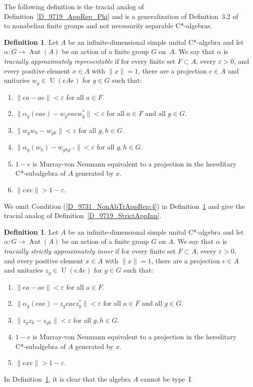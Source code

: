 \documentclass[10pt]{amsart}
\numberwithin{equation}{section}
\theoremstyle{definition}
\newtheorem{dfn}[thm]{Definition}
\newcommand{\af}{\alpha}
\newcommand{\ep}{\varepsilon}
\newcommand{\Aut}{{\operatorname{Aut}}}
\newcommand{\U}{{\operatorname{U}}}
\newcommand{\hsa}{hereditary C*-subalgebra}
\newcommand{\pj}{projection}
\newcommand{\mvnt}{Murray-von Neumann equivalent}
\renewcommand{\S}{\subset}
\newcommand{\Def}[1]{Definition~\ref{#1}}
\begin{document}
 
 The following definition is the tracial analog of Definition~\ref{D_9719_AppRep_Phi} and 
is  a  generalization of Definition~3.2 of~\cite{Ph11}
to nonabelian finite groups and not necessarily separable C*-algebras.
\begin{dfn}\label{D_9731_NonAbTrAppRep}
Let $A$ be an infinite-dimensional simple unital C*-algebra
and let $\af \colon G \to \Aut (A)$
be an action of a finite group $G$ on~$A$.
We say that $\af$ is
{\emph{tracially approximately representable}}
if for every finite set $F \S A$, every $\ep > 0$,
and every positive element $x \in A$ with $\| x \| = 1$,
there are a \pj{} $e \in A$
and unitaries $w_g \in \U (e A e)$ for $g \in G$ such that:
\begin{enumerate}
\item\label{D_9731_NonAbTrAppRep:1} %
$\| e a - a e \| < \ep$ for all $a \in F$.
\item\label{D_9731_NonAbTrAppRep:2} %
$\| \af_g (e a e) - w_g e a e w_g^* \| < \ep$
for all $a \in F$ and all $g \in G$.
\item\label{D_9731_NonAbTrAppRep:3} %
$\| w_g w_h - w_{g h} \| < \ep$ for all $g, h \in G$.
\item\label{D_9731_NonAbTrAppRep:4} %
$\| \af_g (w_h) - w_{g h g^{-1}} \| < \ep$ for all $g, h \in G$.
\item\label{D_9731_NonAbTrAppRep:5} %
$1 - e$ is \mvnt{} to a
\pj{} in the \hsa{} of $A$ generated by $x$.
\item\label{D_9731_NonAbTrAppRep:6} %
$\| e x e \| > 1 - \ep$.
\end{enumerate}
\end{dfn}
We  omit Condition (\ref{D_9731_NonAbTrAppRep:4}) in \Def{D_9731_NonAbTrAppRep} and 
 give the tracial analog of Definition~\ref{D_9719_StrictAppInn}.
\begin{dfn}\label{D_9731_TrStrAppInn}
Let $A$ be an infinite-dimensional simple  unital C*-algebra
and let $\af \colon G \to \Aut (A)$
be an action of a finite  group $G$ on $A$.
We say that $\af$ is
{\emph{tracially strictly approximately inner}}
if for every finite set $F \S A$, every $\ep > 0$,
and every positive element $x \in A$ with $\| x \| = 1$,
there are a \pj{} $e \in A$
and unitaries $z_g \in \U (e A e)$ for $g \in G$  such that:
\begin{enumerate}
\item\label{D_9731_TrStrAppInn:2.1} 
$\| e a - a e \| < \ep$ for all $a \in F$.
\item\label{D_9731_TrStrAppInn:2.2}
$\| \af_g (e a e) - z_g e a e z_g^* \| < \ep$
for all $a \in F$ and all $g \in G$.
\item \label{D_9731_TrStrAppInn:2.3}
$\| z_g z_h - z_{gh}\| < \ep$ for all $g, h \in G$.
\item\label{D_9731_TrStrAppInn:2.4} 
$1 - e$ is \mvnt{} to a
\pj{} in the \hsa{} of $A$ generated by $x$.
\item\label{D_9731_TrStrAppInn:2.5} 
$\| e x e \| > 1 - \ep$.
\end{enumerate}
\end{dfn}
%
In \Def{D_9731_TrStrAppInn},
it is clear that the algebra $A$ cannot be type~I.
\end{document}
